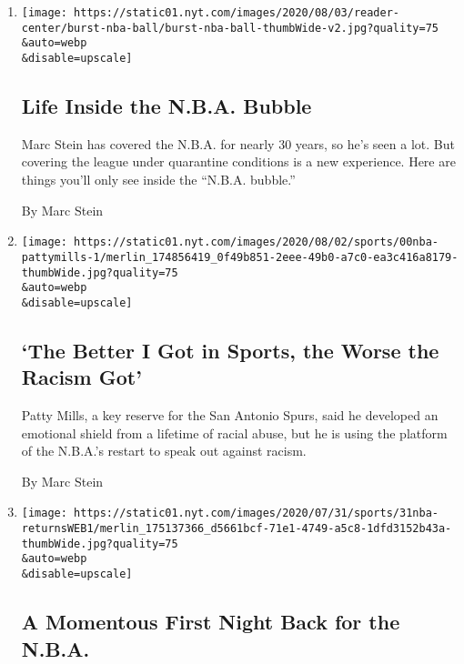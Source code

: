\begin{enumerate}
\def\labelenumi{\arabic{enumi}.}
\item
  \href{/interactive/2020/08/04/sports/nba-bubble-coronavirus.html}{}

  \texttt{[image: https://static01.nyt.com/images/2020/08/03/reader-center/burst-nba-ball/burst-nba-ball-thumbWide-v2.jpg?quality=75\\\&auto=webp\\\&disable=upscale]}

  \hypertarget{life-inside-the-nba-bubble}{%
  \subsection{Life Inside the N.B.A.
  Bubble}\label{life-inside-the-nba-bubble}}

  Marc Stein has covered the N.B.A. for nearly 30 years, so he's seen a
  lot. But covering the league under quarantine conditions is a new
  experience. Here are things you'll only see inside the ``N.B.A.
  bubble.''

  By Marc Stein
\item
  \href{/2020/07/31/sports/basketball/spurs-patty-mills.html}{}

  \texttt{[image: https://static01.nyt.com/images/2020/08/02/sports/00nba-pattymills-1/merlin\_174856419\_0f49b851-2eee-49b0-a7c0-ea3c416a8179-thumbWide.jpg?quality=75\\\&auto=webp\\\&disable=upscale]}

  \hypertarget{the-better-i-got-in-sports-the-worse-the-racism-got}{%
  \subsection{`The Better I Got in Sports, the Worse the Racism
  Got'}\label{the-better-i-got-in-sports-the-worse-the-racism-got}}

  Patty Mills, a key reserve for the San Antonio Spurs, said he
  developed an emotional shield from a lifetime of racial abuse, but he
  is using the platform of the N.B.A.'s restart to speak out against
  racism.

  By Marc Stein
\item
  \href{/2020/07/31/sports/basketball/nba-opening-night.html}{}

  \texttt{[image: https://static01.nyt.com/images/2020/07/31/sports/31nba-returnsWEB1/merlin\_175137366\_d5661bcf-71e1-4749-a5c8-1dfd3152b43a-thumbWide.jpg?quality=75\\\&auto=webp\\\&disable=upscale]}

  \hypertarget{a-momentous-first-night-back-for-the-nba}{%
  \subsection{A Momentous First Night Back for the
  N.B.A.}\label{a-momentous-first-night-back-for-the-nba}}


\end{enumerate}
